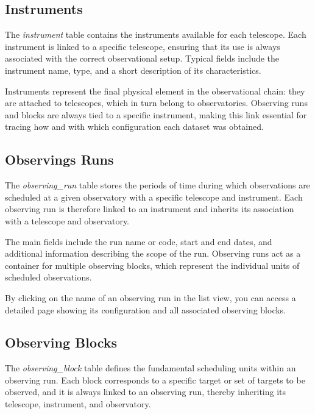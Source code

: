 

\subsection{Instruments}

The \textsl{instrument} table contains the instruments available for each telescope. Each instrument is linked to a specific telescope, ensuring that its use is always associated with the correct observational setup. Typical fields include the instrument name, type, and a short description of its characteristics.

Instruments represent the final physical element in the observational chain: they are attached to telescopes, which in turn belong to observatories. Observing runs and blocks are always tied to a specific instrument, making this link essential for tracing how and with which configuration each dataset was obtained.



\subsection{Observings Runs}

The \textsl{observing\_run} table stores the periods of time during which observations are scheduled at a given observatory with a specific telescope and instrument. Each observing run is therefore linked to an instrument and inherits its association with a telescope and observatory.

The main fields include the run name or code, start and end dates, and additional information describing the scope of the run. Observing runs act as a container for multiple observing blocks, which represent the individual units of scheduled observations.


By clicking on the name of an observing run in the list view, you can access a detailed page showing its configuration and all associated observing blocks.

\subsection{Observing Blocks}

The \textsl{observing\_block} table defines the fundamental scheduling units within an observing run. Each block corresponds to a specific target or set of targets to be observed, and it is always linked to an observing run, thereby inheriting its telescope, instrument, and observatory.

